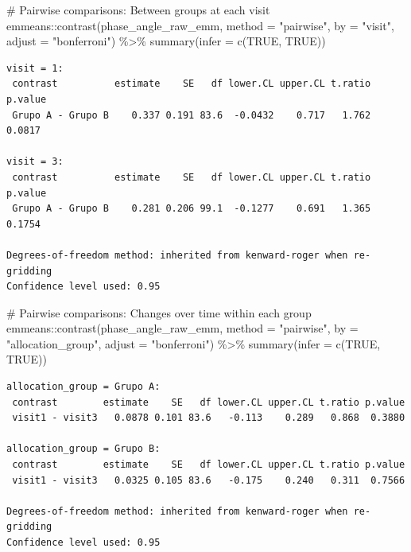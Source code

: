 \documentclass[
  letterpaper,
  DIV=11,
  numbers=noendperiod]{scrartcl}
\newenvironment{Shaded}{\begin{snugshade}}{\end{snugshade}}
\newcommand{\AttributeTok}[1]{\textcolor[rgb]{0.40,0.45,0.13}{#1}}
\newcommand{\CommentTok}[1]{\textcolor[rgb]{0.37,0.37,0.37}{#1}}
\newcommand{\ConstantTok}[1]{\textcolor[rgb]{0.56,0.35,0.01}{#1}}
\newcommand{\FunctionTok}[1]{\textcolor[rgb]{0.28,0.35,0.67}{#1}}
\newcommand{\NormalTok}[1]{\textcolor[rgb]{0.00,0.23,0.31}{#1}}
\newcommand{\SpecialCharTok}[1]{\textcolor[rgb]{0.37,0.37,0.37}{#1}}
\newcommand{\StringTok}[1]{\textcolor[rgb]{0.13,0.47,0.30}{#1}}
\begin{document}
\begin{Shaded}
\begin{Highlighting}[]
\CommentTok{\# Pairwise comparisons: Between groups at each visit}
\NormalTok{emmeans}\SpecialCharTok{::}\FunctionTok{contrast}\NormalTok{(phase\_angle\_raw\_emm, }\AttributeTok{method =} \StringTok{"pairwise"}\NormalTok{, }\AttributeTok{by =} \StringTok{"visit"}\NormalTok{, }\AttributeTok{adjust =} \StringTok{"bonferroni"}\NormalTok{) }\SpecialCharTok{\%\textgreater{}\%} \FunctionTok{summary}\NormalTok{(}\AttributeTok{infer =} \FunctionTok{c}\NormalTok{(}\ConstantTok{TRUE}\NormalTok{, }\ConstantTok{TRUE}\NormalTok{))}
\end{Highlighting}
\end{Shaded}

\begin{verbatim}
visit = 1:
 contrast          estimate    SE   df lower.CL upper.CL t.ratio p.value
 Grupo A - Grupo B    0.337 0.191 83.6  -0.0432    0.717   1.762  0.0817

visit = 3:
 contrast          estimate    SE   df lower.CL upper.CL t.ratio p.value
 Grupo A - Grupo B    0.281 0.206 99.1  -0.1277    0.691   1.365  0.1754

Degrees-of-freedom method: inherited from kenward-roger when re-gridding 
Confidence level used: 0.95 
\end{verbatim}

\begin{Shaded}
\begin{Highlighting}[]
\CommentTok{\# Pairwise comparisons: Changes over time within each group}
\NormalTok{emmeans}\SpecialCharTok{::}\FunctionTok{contrast}\NormalTok{(phase\_angle\_raw\_emm, }\AttributeTok{method =} \StringTok{"pairwise"}\NormalTok{, }\AttributeTok{by =} \StringTok{"allocation\_group"}\NormalTok{, }\AttributeTok{adjust =} \StringTok{"bonferroni"}\NormalTok{) }\SpecialCharTok{\%\textgreater{}\%} \FunctionTok{summary}\NormalTok{(}\AttributeTok{infer =} \FunctionTok{c}\NormalTok{(}\ConstantTok{TRUE}\NormalTok{, }\ConstantTok{TRUE}\NormalTok{))}
\end{Highlighting}
\end{Shaded}

\begin{verbatim}
allocation_group = Grupo A:
 contrast        estimate    SE   df lower.CL upper.CL t.ratio p.value
 visit1 - visit3   0.0878 0.101 83.6   -0.113    0.289   0.868  0.3880

allocation_group = Grupo B:
 contrast        estimate    SE   df lower.CL upper.CL t.ratio p.value
 visit1 - visit3   0.0325 0.105 83.6   -0.175    0.240   0.311  0.7566

Degrees-of-freedom method: inherited from kenward-roger when re-gridding 
Confidence level used: 0.95 
\end{verbatim}
\end{document}

